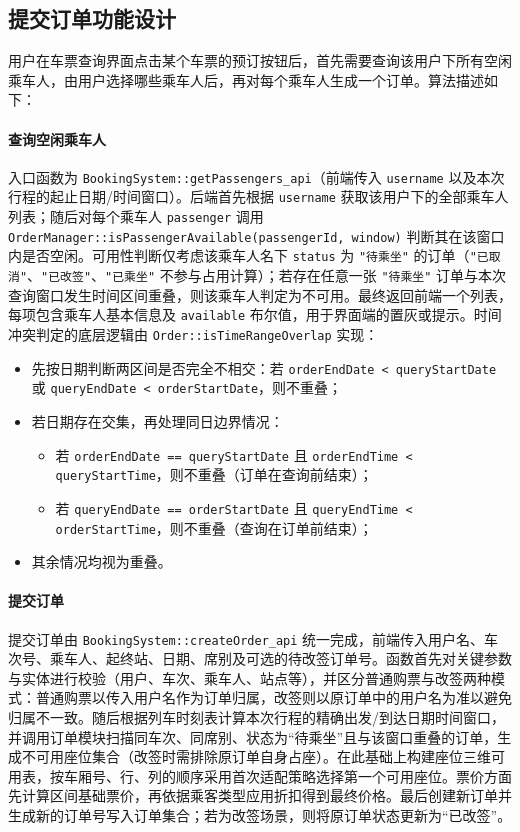 \documentclass{article}
\begin{document}
		\subsection{提交订单功能设计}
			用户在车票查询界面点击某个车票的预订按钮后，首先需要查询该用户下所有空闲乘车人，由用户选择哪些乘车人后，再对每个乘车人生成一个订单。算法描述如下：
			
			\paragraph{查询空闲乘车人} 入口函数为 \texttt{BookingSystem::getPassengers\_api}（前端传入 \texttt{username} 以及本次行程的起止日期/时间窗口）。后端首先根据 \texttt{username} 获取该用户下的全部乘车人列表；随后对每个乘车人 \texttt{passenger} 调用 \texttt{OrderManager::isPassengerAvailable(passengerId, window)} 判断其在该窗口内是否空闲。可用性判断仅考虑该乘车人名下 \texttt{status} 为 \texttt{"待乘坐"} 的订单（\texttt{"已取消"}、\texttt{"已改签"}、\texttt{"已乘坐"} 不参与占用计算）；若存在任意一张 \texttt{"待乘坐"} 订单与本次查询窗口发生时间区间重叠，则该乘车人判定为不可用。最终返回前端一个列表，每项包含乘车人基本信息及 \texttt{available} 布尔值，用于界面端的置灰或提示。时间冲突判定的底层逻辑由 \texttt{Order::isTimeRangeOverlap} 实现：
			\begin{itemize}
			  \item 先按日期判断两区间是否完全不相交：若 \texttt{orderEndDate < queryStartDate} 或 \texttt{queryEndDate < orderStartDate}，则不重叠；
			  \item 若日期存在交集，再处理同日边界情况：
			    \begin{itemize}
			      \item 若 \texttt{orderEndDate == queryStartDate} 且 \texttt{orderEndTime < queryStartTime}，则不重叠（订单在查询前结束）；
			      \item 若 \texttt{queryEndDate == orderStartDate} 且 \texttt{queryEndTime < orderStartTime}，则不重叠（查询在订单前结束）；
			    \end{itemize}
			  \item 其余情况均视为重叠。
			\end{itemize}
			
			\paragraph{提交订单} 提交订单由 \texttt{BookingSystem::createOrder\_api} 统一完成，前端传入用户名、车次号、乘车人、起终站、日期、席别及可选的待改签订单号。函数首先对关键参数与实体进行校验（用户、车次、乘车人、站点等），并区分普通购票与改签两种模式：普通购票以传入用户名作为订单归属，改签则以原订单中的用户名为准以避免归属不一致。随后根据列车时刻表计算本次行程的精确出发/到达日期时间窗口，并调用订单模块扫描同车次、同席别、状态为“待乘坐”且与该窗口重叠的订单，生成不可用座位集合（改签时需排除原订单自身占座）。在此基础上构建座位三维可用表，按车厢号、行、列的顺序采用首次适配策略选择第一个可用座位。票价方面先计算区间基础票价，再依据乘客类型应用折扣得到最终价格。最后创建新订单并生成新的订单号写入订单集合；若为改签场景，则将原订单状态更新为“已改签”。
			\newline
			
\end{document}
